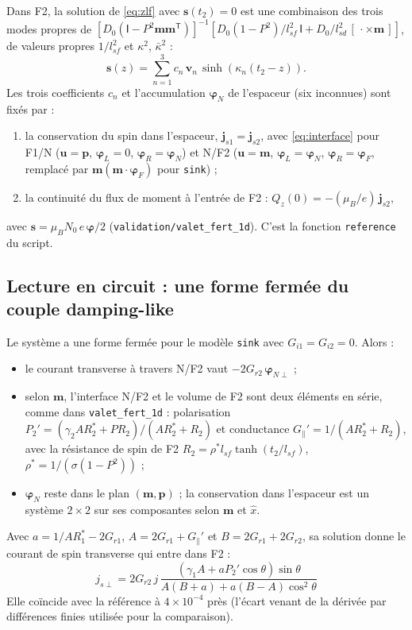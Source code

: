 \documentclass[11pt,a4paper]{article}
\newcommand{\vm}{\bm{m}}
\newcommand{\vp}{\bm{p}}
\newcommand{\vs}{\bm{s}}
\newcommand{\vu}{\bm{u}}
\newcommand{\vphi}{\bm{\varphi}}
\newcommand{\Id}{\mathsf{I}}
\begin{document}
Dans F2, la solution de \eqref{eq:zlf} avec $\vs(t_2) = 0$ est une
combinaison des trois modes propres de
$\left[D_0(\Id - P^2\vm\vm^{\mathsf{T}})\right]^{-1}
\left[D_0(1-P^2)/l_{sf}^2\,\Id + D_0/l_{sd}^2\,[\,\cdot\times\vm\,]\right]$,
de valeurs propres $1/l_{sf}^2$ et $\kappa^2$, $\bar\kappa^2$ :
\begin{equation}
  \vs(z) = \sum_{n=1}^{3} c_n\,\bm{v}_n\,\sinh\left(\kappa_n(t_2-z)\right).
\end{equation}
Les trois coefficients $c_n$ et l'accumulation $\vphi_N$ de l'espaceur
(six inconnues) sont fixés par :
\begin{enumerate}
  \item la conservation du spin dans l'espaceur, $\bm{j}_{s1} =
    \bm{j}_{s2}$, avec \eqref{eq:interface} pour F1/N ($\vu = \vp$,
    $\vphi_L = 0$, $\vphi_R = \vphi_N$) et N/F2 ($\vu = \vm$,
    $\vphi_L = \vphi_N$, $\vphi_R = \vphi_F$, remplacé par
    $\vm(\vm\cdot\vphi_F)$ pour \texttt{sink}) ;
  \item la continuité du flux de moment à l'entrée de F2 :
    $Q_z(0) = -(\mu_B/e)\,\bm{j}_{s2}$,
\end{enumerate}
avec $\vs = \mu_BN_0\,e\,\vphi/2$ (\texttt{validation/valet\_fert\_1d}).
C'est la fonction \texttt{reference} du script.

\subsection{Lecture en circuit : une forme fermée du couple damping-like}
\label{sec:fermee}

Le système a une forme fermée pour le modèle \texttt{sink} avec
$G_{i1} = G_{i2} = 0$. Alors :
\begin{itemize}
  \item le courant transverse à travers N/F2 vaut $-2G_{r2}\,\vphi_{N\perp}$ ;
  \item selon $\vm$, l'interface N/F2 et le volume de F2 sont deux
    éléments en série, comme dans \texttt{valet\_fert\_1d} : polarisation
    $P_2' = (\gamma_2AR_2^* + PR_2)/(AR_2^* + R_2)$ et conductance
    $G_\parallel' = 1/(AR_2^*+R_2)$, avec la résistance de spin de F2
    $R_2 = \rho^*l_{sf}\tanh(t_2/l_{sf})$, $\rho^* = 1/(\sigma(1-P^2))$ ;
  \item $\vphi_N$ reste dans le plan $(\vm, \vp)$ ; la conservation dans
    l'espaceur est un système $2\times2$ sur ses composantes selon $\vm$
    et $\hat x$.
\end{itemize}
Avec $a = 1/AR_1^* - 2G_{r1}$, $A = 2G_{r1} + G_\parallel'$ et
$B = 2G_{r1} + 2G_{r2}$, sa solution donne le courant de spin transverse
qui entre dans F2 :
\begin{equation}
  \boxed{\;j_{s\perp} = 2G_{r2}\,j\,
  \frac{\left(\gamma_1A + aP_2'\cos\theta\right)\sin\theta}
       {A(B+a) + a(B-A)\cos^2\theta}\;}
  \label{eq:fermee}
\end{equation}
Elle coïncide avec la référence à $4\times10^{-4}$ près (l'écart venant de
la dérivée par différences finies utilisée pour la comparaison).
\end{document}
